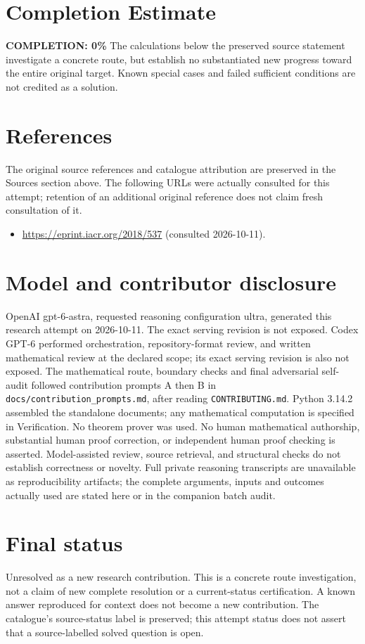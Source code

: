 \documentclass[11pt]{article}
\begin{document}
\section{Completion Estimate}
\noindent\textbf{COMPLETION: 0\%}
The calculations below the preserved source statement investigate a concrete route,
but establish no substantiated new progress toward the entire original target.
Known special cases and failed sufficient conditions are not credited as a solution.
\section{References}
The original source references and catalogue attribution are preserved in the
Sources section above. The following URLs were actually consulted for this attempt;
retention of an additional original reference does not claim fresh consultation of it.
\begin{itemize}
\item \url{https://eprint.iacr.org/2018/537} (consulted 2026-10-11). 
\end{itemize}
\section{Model and contributor disclosure}
OpenAI gpt-6-astra, requested reasoning configuration ultra, generated this research
attempt on 2026-10-11. The exact serving revision is not exposed. Codex GPT-6
performed orchestration, repository-format review, and written mathematical review at the declared scope; its exact serving revision
is also not exposed. The mathematical route, boundary checks and final adversarial
self-audit followed contribution prompts A then B in
\texttt{docs/contribution\_prompts.md}, after reading \texttt{CONTRIBUTING.md}.
Python 3.14.2 assembled the standalone documents; any mathematical computation is
specified in Verification. No theorem prover was used. No human mathematical
authorship, substantial human proof correction, or independent human proof checking
is asserted. Model-assisted review, source retrieval, and structural checks do not
establish correctness or novelty. Full private reasoning transcripts are unavailable
as reproducibility artifacts; the complete arguments, inputs and outcomes actually
used are stated here or in the companion batch audit.
\section{Final status}
Unresolved as a new research contribution. This is a concrete route investigation,
not a claim of new complete resolution or a current-status certification. A known
answer reproduced for context does not become a new contribution. The catalogue's
source-status label is preserved; this attempt status does not assert that a
source-labelled solved question is open.
\end{document}
